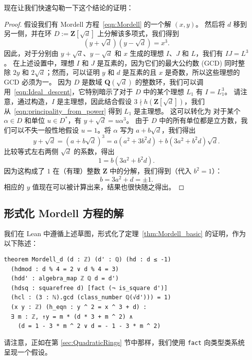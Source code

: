\documentclass[sigplan,10pt,nonacm,
screen]{acmart} \settopmatter{printfolios=true,printccs=false,printacmref=false}
\newcommand{\coloneqq}{:=}
\newcommand{\QQ}{\mathbf{Q}}
\newcommand{\ZZ}{\mathbf{Z}}
\begin{document}
现在让我们快速勾勒一下这个结论的证明：
\begin{proof}
假设我们有 Mordell 方程~\eqref{eqn:Mordell} 的一个解 $(x,y)$。
然后将 $d$ 移到另一侧，并在环 $D\coloneqq \ZZ[\sqrt{d}]$ 上分解该多项式，我们得到
\[(y+\sqrt{d})(y-\sqrt{d})=x^3.\]
因此，对于分别由 $y+\sqrt{d}$、$y-\sqrt{d}$ 和 $x$ 生成的理想 $I$、$J$ 和 $L$，我们有 $IJ=L^3$。
在上述设置中，理想 $I$ 和 $J$ 是互素的，因为它们的最大公约数 (GCD) 同时整除 $2y$ 和 $2\sqrt{d}$；然而，可以证明 $y$ 和 $d$ 是互素的且 $x$ 是奇数，所以这些理想的 GCD 必须为一。
因为 $D$ 是数域 $\QQ(\sqrt{d})$ 的整数环，我们可以调用~\eqref{eqn:Ideal_descent}，它特别暗示了对于 $D$ 中的某个理想 $L_1$ 有 $I=L_1^3$。
请注意，通过构造，$I$ 是主理想，因此结合假设 $3\nmid h(\ZZ[\sqrt{d}])$，我们从~\eqref{eqn:principality_from_power} 得到 $L_1$ 是主理想。
这可以转化为
对于某个 $\alpha \in D$ 和单位 $u \in D^*$，有 $y+\sqrt{d}=u \alpha^3$。
由于 $D$ 中的所有单位都是立方数，我们可以不失一般性地假设 $u=1$。将 $\alpha$ 写为 $a+b\sqrt{d}$，我们得出
\[y+\sqrt{d}=(a+b\sqrt{d})^3=a(a^2+3b^2d)+b(3a^2+b^2d)\sqrt{d}.\]
比较等式左右两侧 $\sqrt{d}$ 的系数，得出
\[1=b(3a^2+b^2d).\]
因为这构成了 $1$ 在（有理）整数 $\ZZ$ 中的分解，我们得到（代入 $b^2=1$）：
\[b=3a^2+d=\pm 1.\]%
相应的 $y$ 值现在可以被计算出来，结果也很快随之得出。
\end{proof}

\subsection{形式化 Mordell 方程的解}

我们在 Lean 中遵循上述草图，形式化了定理~\ref{thm:Mordell_basic} 的证明，作为以下陈述：
\begin{lstlisting}
theorem Mordell_d (d : ℤ) (d' : ℚ) (hd : d ≤ -1)
  (hdmod : d % 4 = 2 ∨ d % 4 = 3)
  (hdd' : algebra_map ℤ ℚ d = d')
  (hdsq : squarefree d) [fact (¬ is_square d')]
  (hcl : (3 : ℕ).gcd (class_number ℚ(√d'))) = 1)
  (x y : ℤ) (h_eqn : y ^ 2 = x ^ 3 + d) :
  ∃ m : ℤ, ↑y = m * (d * 3 + m ^ 2) ∧
    (d = 1 - 3 * m ^ 2 ∨ d = - 1 - 3 * m ^ 2)
\end{lstlisting}

请注意，正如在第 \ref{sec:QuadraticRings} 节中那样，我们使用 \lstinline{fact} 向类型类系统呈现一个假设。
\end{document}
